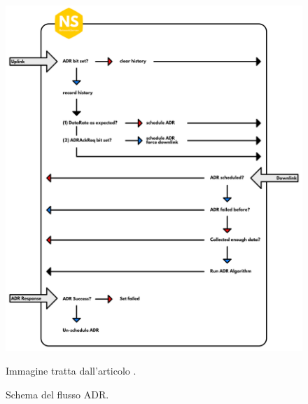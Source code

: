 \documentclass[a4paper]{report} %
\begin{document}
\begin{figure}
\centering
\includegraphics[scale=.5]{Immagini/adr.png}

\caption{Schema del flusso ADR.}
\label{fig:adr}
Immagine tratta dall'articolo \cite{art:rif.32}.\\
\end{figure}
\end{document}
